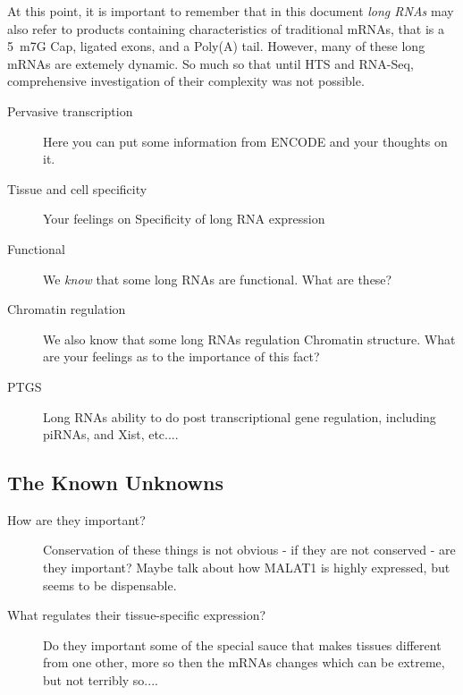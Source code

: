 At this point, it is important to remember that in this document \textit{long RNAs} may also refer to products containing characteristics of traditional mRNAs, that is a 5\textprime~m7G Cap, ligated exons, and a Poly(A) tail. However, many of these long mRNAs are extemely dynamic. So much so that until HTS and RNA-Seq, comprehensive investigation of their complexity was not possible.


\begin{description}
	\item[Pervasive transcription]
	Here you can put some information from ENCODE and your thoughts on it.

	\item[Tissue and cell specificity]
	Your feelings on Specificity of long RNA expression

	\item[Functional]
	We \textit{know} that some long RNAs are functional. What are these?

	\item[Chromatin regulation]
	We also know that some long RNAs regulation Chromatin structure. What are your feelings as to the importance of this fact?

	\item[PTGS]
	Long RNAs ability to do post transcriptional gene regulation, including piRNAs, and Xist, etc....

\end{description}

\subsection{The Known Unknowns}\label{subsec: The Known Unknowns}

\begin{description}
	\item[How are they important?] 
	Conservation of these things is not obvious - if they are not conserved - are they important? Maybe talk about how MALAT1 is highly expressed, but seems to be dispensable.

	\item[What regulates their tissue-specific expression?]
	Do they important some of the special sauce that makes tissues different from one other, more so then the mRNAs changes which can be extreme, but not terribly so....

	\item[]  

\end{description}

